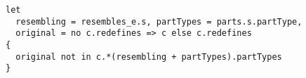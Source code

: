 \lstset{frame=tb, aboveskip=12pt, belowskip=-3pt, breaklines=true, basicstyle=\small\ttfamily, tabsize=2, mathescape=true}
\begin{lstlisting}[caption={wellformed\_components.als, lines 19-24}, label=alloy:WF_COMPONENT_CONTAINMENT, captionpos=b]
let
  resembling = resembles_e.s, partTypes = parts.s.partType,
  original = no c.redefines => c else c.redefines
{
  original not in c.*(resembling + partTypes).partTypes
}
\end{lstlisting}